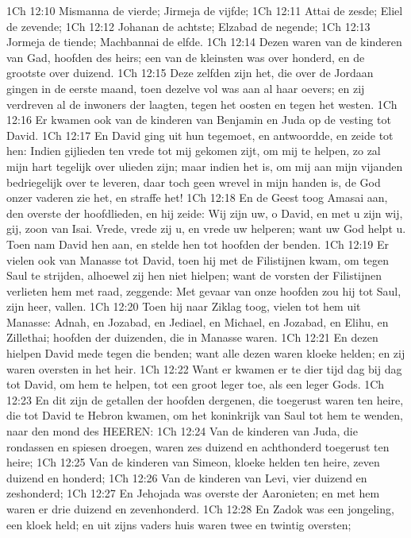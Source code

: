1Ch 12:10  Mismanna de vierde; Jirmeja de vijfde;
1Ch 12:11  Attai de zesde; Eliel de zevende;
1Ch 12:12  Johanan de achtste; Elzabad de negende;
1Ch 12:13  Jormeja de tiende; Machbannai de elfde.
1Ch 12:14  Dezen waren van de kinderen van Gad, hoofden des heirs; een van de kleinsten was over honderd, en de grootste over duizend.
1Ch 12:15  Deze zelfden zijn het, die over de Jordaan gingen in de eerste maand, toen dezelve vol was aan al haar oevers; en zij verdreven al de inwoners der laagten, tegen het oosten en tegen het westen.
1Ch 12:16  Er kwamen ook van de kinderen van Benjamin en Juda op de vesting tot David.
1Ch 12:17  En David ging uit hun tegemoet, en antwoordde, en zeide tot hen: Indien gijlieden ten vrede tot mij gekomen zijt, om mij te helpen, zo zal mijn hart tegelijk over ulieden zijn; maar indien het is, om mij aan mijn vijanden bedriegelijk over te leveren, daar toch geen wrevel in mijn handen is, de God onzer vaderen zie het, en straffe het!
1Ch 12:18  En de Geest toog Amasai aan, den overste der hoofdlieden, en hij zeide: Wij zijn uw, o David, en met u zijn wij, gij, zoon van Isai. Vrede, vrede zij u, en vrede uw helperen; want uw God helpt u. Toen nam David hen aan, en stelde hen tot hoofden der benden.
1Ch 12:19  Er vielen ook van Manasse tot David, toen hij met de Filistijnen kwam, om tegen Saul te strijden, alhoewel zij hen niet hielpen; want de vorsten der Filistijnen verlieten hem met raad, zeggende: Met gevaar van onze hoofden zou hij tot Saul, zijn heer, vallen.
1Ch 12:20  Toen hij naar Ziklag toog, vielen tot hem uit Manasse: Adnah, en Jozabad, en Jediael, en Michael, en Jozabad, en Elihu, en Zillethai; hoofden der duizenden, die in Manasse waren.
1Ch 12:21  En dezen hielpen David mede tegen die benden; want alle dezen waren kloeke helden; en zij waren oversten in het heir.
1Ch 12:22  Want er kwamen er te dier tijd dag bij dag tot David, om hem te helpen, tot een groot leger toe, als een leger Gods.
1Ch 12:23  En dit zijn de getallen der hoofden dergenen, die toegerust waren ten heire, die tot David te Hebron kwamen, om het koninkrijk van Saul tot hem te wenden, naar den mond des HEEREN:
1Ch 12:24  Van de kinderen van Juda, die rondassen en spiesen droegen, waren zes duizend en achthonderd toegerust ten heire;
1Ch 12:25  Van de kinderen van Simeon, kloeke helden ten heire, zeven duizend en honderd;
1Ch 12:26  Van de kinderen van Levi, vier duizend en zeshonderd;
1Ch 12:27  En Jehojada was overste der Aaronieten; en met hem waren er drie duizend en zevenhonderd.
1Ch 12:28  En Zadok was een jongeling, een kloek held; en uit zijns vaders huis waren twee en twintig oversten;
